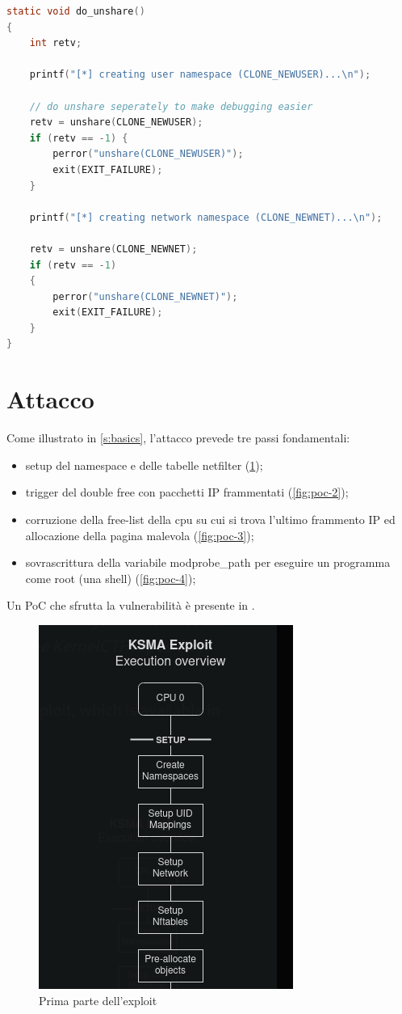 \documentclass{article}
\begin{document}
\begin{lstlisting}[language=C,style=CStyle,caption="Setup network namespace come utente non privilegiato"]
static void do_unshare()
{
    int retv;

    printf("[*] creating user namespace (CLONE_NEWUSER)...\n");
    
	// do unshare seperately to make debugging easier
    retv = unshare(CLONE_NEWUSER);
	if (retv == -1) {
        perror("unshare(CLONE_NEWUSER)");
        exit(EXIT_FAILURE);
    }

    printf("[*] creating network namespace (CLONE_NEWNET)...\n");

    retv = unshare(CLONE_NEWNET);
    if (retv == -1)
	{
		perror("unshare(CLONE_NEWNET)");
		exit(EXIT_FAILURE);
	}
}
\end{lstlisting}

\clearpage
\section{Attacco}
Come illustrato in \cref{s:basics}, l'attacco prevede tre 
passi fondamentali:
\begin{itemize}
  \item setup del namespace e delle tabelle netfilter (\cref{fig:poc-1});
  \item trigger del double free con pacchetti IP frammentati (\cref{fig:poc-2});
  \item corruzione della free-list della cpu su cui si trova l'ultimo frammento IP ed allocazione 
    della pagina malevola (\cref{fig:poc-3});
  \item sovrascrittura della variabile modprobe\_path per eseguire un programma come root 
    (una shell) (\cref{fig:poc-4});
\end{itemize}
Un PoC che sfrutta la vulnerabilità è presente in \cite{ExploitPoC}.

\begin{figure}[h]
  \begin{center}
    \includegraphics[width=.25\textwidth]{figures/ch1/poc-1.png}
  \end{center}
  \caption{Prima parte dell'exploit}\label{fig:poc-1}
\end{figure}
\end{document}
